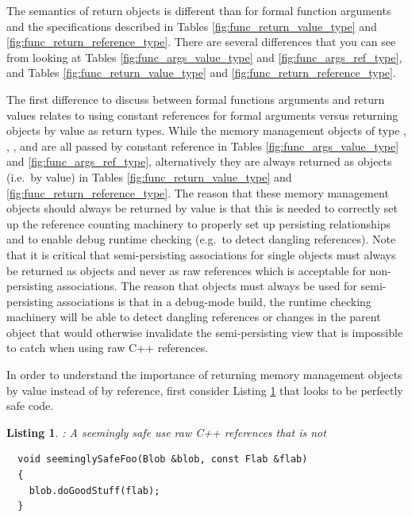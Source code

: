 \documentclass[pdf,ps2pdf,11pt]{SANDreport}
\newtheorem{listing}{Listing}
\begin{document}
The semantics of return objects is different than for formal function
arguments and the specifications described in Tables
{}\ref{fig:func_return_value_type} and
{}\ref{fig:func_return_reference_type}.  There are several differences
that you can see from looking at Tables
{}\ref{fig:func_args_value_type} and {}\ref{fig:func_args_ref_type},
and Tables {}\ref{fig:func_return_value_type} and
{}\ref{fig:func_return_reference_type}.

The first difference to discuss between formal functions arguments and
return values relates to using constant references for formal
arguments versus returning objects by value as return types.  While
the memory management objects of type {}, {},
{}, and {} are all passed by constant
reference in Tables {}\ref{fig:func_args_value_type} and
{}\ref{fig:func_args_ref_type}, alternatively they are always returned
as objects (i.e.\ by value) in Tables
{}\ref{fig:func_return_value_type} and
{}\ref{fig:func_return_reference_type}.  The reason that these memory
management objects should always be returned by value is that this is
needed to correctly set up the reference counting machinery to
properly set up persisting relationships and to enable debug runtime
checking (e.g.\ to detect dangling references).  Note that it is
critical that semi-persisting associations for single objects must
always be returned as {} objects and never as raw
references {} which is acceptable for non-persisting
associations.  The reason that {} objects must always be
used for semi-persisting associations is that in a debug-mode build,
the runtime checking machinery will be able to detect dangling
references or changes in the parent object that would otherwise
invalidate the semi-persisting view that is impossible to catch when
using raw C++ references.

In order to understand the importance of returning memory management
objects by value instead of by reference, first consider Listing
{}\ref{listing:unsafe_raw_C++_reference1} that looks to be perfectly
safe code.

\begin{listing}: A seemingly safe use raw C++ references that is not \\
\label{listing:unsafe_raw_C++_reference1}
{\small\begin{verbatim}
  void seeminglySafeFoo(Blob &blob, const Flab &flab)
  {
    blob.doGoodStuff(flab);
  }
\end{verbatim}}
\end{listing}
\end{document}
